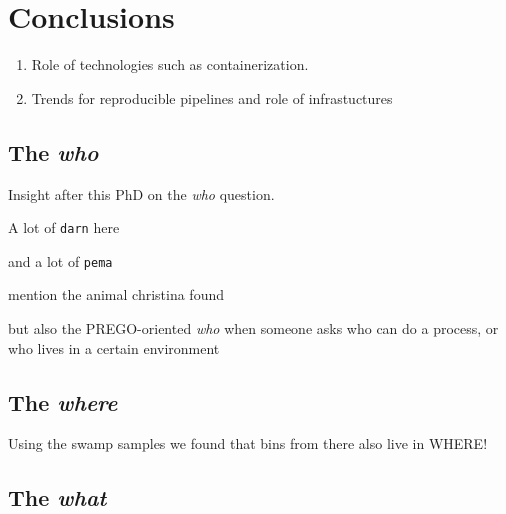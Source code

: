% 
% 

\chapter{Conclusions}
\label{cha:conclusion}


\begin{enumerate}
   \item Role of technologies such as containerization. 
   \item Trends for reproducible pipelines and role of infrastuctures
\end{enumerate}



\section{The \textit{who}}

   Insight after this PhD on the \textit{who} question. 

   A lot of \texttt{darn} here

   and a lot of \texttt{pema}

   mention the animal christina found 


   but also the PREGO-oriented \textit{who} when
   someone asks who can do a process, or who lives 
   in a certain environment 




\section{The \textit{where}}

   Using the swamp samples we found that 
   bins from there also live in WHERE!




\section{The \textit{what}}





